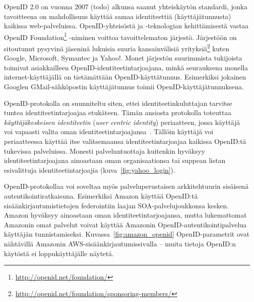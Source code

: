 \documentclass[finnish,gradu]{tktltiki}
\begin{document}

  OpenID 2.0 on vuonna 2007 (todo) alkunsa saanut yhteiskäytön standardi, jonka tavoitteena on mahdollisuus käyttää samaa identiteettiä (käyttäjätunnusta) kaikissa web-palveluissa. OpenID-yhteisöstä ja -teknologian kehittämisestä vastaa OpenID Foundation\footnote{\url{http://openid.net/foundation/}} -niminen voittoa tavoittelematon järjestö. Järjestöön on sitoutunut pysyvinä jäseninä lukuisia suuria kansainvälisiä yrityksiä\footnote{\url{http://openid.net/foundation/sponsoring-members/}} kuten Google, Microsoft, Symantec ja Yahoo!. Monet järjestön suurimmista tukijoista toimivat asiakkailleen OpenID-identiteetintarjoajana, minkä seurauksena monella internet-käyttäjällä on tietämättään OpenID-käyttätunnus. Esimerkiksi jokainen Googlen GMail-sähköpostin käyttäjätunnus toimii  OpenID-käyttäjätunnuksena.

  OpenID-protokolla on suunniteltu siten, ettei identiteetinkuluttajan tarvitse tuntea identiteetintarjoajaa etukäteen. Tämän ansiosta protokolla toteuttaa \emph{käyttäjäkeskeisen identiteetin} (\emph{user centric identity}) periaatteen, jossa käyttäjä voi vapaasti valita oman identiteetintarjoajansa~\cite{openid_recordon_2009}. Tällöin käyttäjä voi periaatteessa käyttää itse valitsemaansa identiteetintarjoajaa kaikissa OpenID:tä tukevissa palveluissa.
  Monesti palveluntuottaja kuitenkin hyväksyy identiteetintarjoajana ainoastaan oman organisaationsa tai suppean listan esivalittuja identiteetintarjoajia (kuva~\ref{fig:yahoo_login}).

  OpenID-protokollaa voi soveltaa myös palveluperustaisen arkkitehtuurin sisäisenä autentikointiratkaisuna. Esimerkiksi Amazon käyttää OpenID:tä sisäänkirjautumistietojen federointiin laajan SOA-palvelujoukkonsa kesken. Amazon hyväksyy ainoastaan oman identiteetintarjoajansa, mutta lukemattomat Amazonin omat palvelut voivat käyttää Amazonin OpenID-autentikointipalvelua käyttäjän tunnistamiseksi.  Kuvassa~\ref{fig:amazon_openid} OpenID-parametrit ovat nähtävillä Amazonin AWS-sisäänkirjautumissivulla -- muita tietoja OpenID:n käytöstä ei loppukäyttäjälle näytetä.
\end{document}
